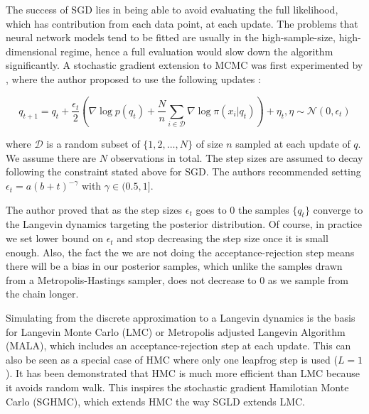 \documentclass[12pt]{report}
\begin{document}
The success of SGD lies in being able to avoid evaluating the full likelihood, which has contribution from each data point, at each update. The problems that neural network models tend to be fitted are usually in the high-sample-size, high-dimensional regime, hence a full evaluation would slow down the algorithm significantly. A stochastic gradient extension to MCMC was first experimented by \cite{welling2011bayesian}, where the author proposed to use the following updates :

\[q_{t+1} = q_t + \frac{\epsilon_t}{2} ( \nabla \log p(q_t) + \frac{N}{n} \sum_{i \in \mathcal{D}} \nabla \log \pi(x_i|q_t) ) + \eta_t , \eta \sim \mathcal{N}(0,\epsilon_t) \]

where $\mathcal{D}$ is a random subset of $\{1,2, \dots, N\}$ of size $n$ sampled at each update of $q$. We assume there are $N$ observations in total. The step sizes are assumed to decay following the constraint stated above for SGD. The authors recommended setting $\epsilon_t = a(b+t)^{-\gamma} $ with $\gamma \in (0.5,1]$.  

The author proved that as the step sizes $\epsilon_t$ goes to $0$ the samples $\{q_t\}$ converge to the Langevin dynamics targeting the posterior distribution. Of course, in practice we set lower bound on $\epsilon_t$ and stop decreasing the step size once it is small enough. Also, the fact the we are not doing the acceptance-rejection step means there will be a bias in our posterior samples, which unlike the samples drawn from a Metropolis-Hastings sampler, does not decrease to $0$ as we sample from the chain longer.


Simulating from the discrete approximation to a Langevin dynamics is the basis
for Langevin Monte Carlo (LMC) or Metropolis adjusted Langevin Algorithm (MALA), which
includes an acceptance-rejection step at each update. This can also be seen as a
special case of HMC where only one leapfrog step is used ($L=1$). It has been
demonstrated that HMC is much more efficient than LMC because it avoids random
walk. This inspires the
stochastic gradient Hamilotian Monte Carlo (SGHMC), 
which extends HMC the way SGLD extends LMC. 
\end{document}
